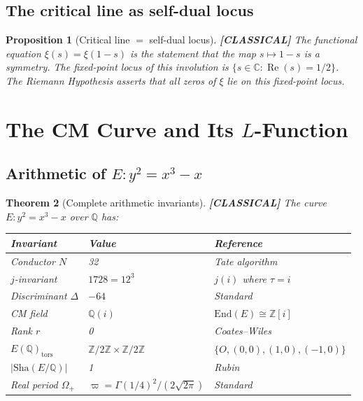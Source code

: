 \documentclass[11pt]{article}
\theoremstyle{tight}
\newtheorem{theorem}{Theorem}[section]
\newtheorem{proposition}[theorem]{Proposition}
\theoremstyle{plainroman}
\newcommand{\C}{\mathbb{C}}
\newcommand{\Z}{\mathbb{Z}}
\newcommand{\Q}{\mathbb{Q}}
\begin{document}
\subsection{The critical line as self-dual locus}

\begin{proposition}[Critical line $=$ self-dual locus]\label{prop:critical}
\textbf{[CLASSICAL]}
The functional equation $\xi(s)=\xi(1-s)$ is the statement that the map $s\mapsto 1-s$ is a symmetry.
The fixed-point locus of this involution is $\{s\in\C:\operatorname{Re}(s)=1/2\}$.
The Riemann Hypothesis asserts that all zeros of $\xi$ lie on this fixed-point locus.
\end{proposition}

\section{The CM Curve and Its $L$-Function}

\subsection{Arithmetic of $E:y^2=x^3-x$}

\begin{theorem}[Complete arithmetic invariants]\label{thm:arithmetic}
\textbf{[CLASSICAL]}
The curve $E:y^2=x^3-x$ over $\Q$ has:
\begin{center}
\renewcommand{\arraystretch}{1.2}
\begin{tabular}{lll}
\toprule
\textbf{Invariant} & \textbf{Value} & \textbf{Reference} \\
\midrule
Conductor $N$ & 32 & Tate algorithm \\
$j$-invariant & $1728=12^3$ & $j(i)$ where $\tau=i$ \\
Discriminant $\Delta$ & $-64$ & Standard \\
CM field & $\Q(i)$ & $\mathrm{End}(E)\cong\Z[i]$ \\
Rank $r$ & 0 & Coates--Wiles~\cite{coateswiles} \\
$E(\Q)_{\mathrm{tors}}$ & $\Z/2\Z\times\Z/2\Z$ & $\{O,(0,0),(1,0),(-1,0)\}$ \\
$|\mathrm{Sha}(E/\Q)|$ & 1 & Rubin~\cite{rubin} \\
Real period $\Omega_+$ & $\varpi=\Gamma(1/4)^2/(2\sqrt{2\pi})$ & Standard \\
\bottomrule
\end{tabular}
\end{center}
\end{theorem}
\end{document}
